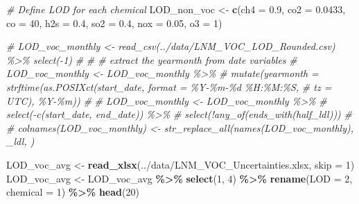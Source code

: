\documentclass[
]{article}
\newenvironment{Shaded}{\begin{snugshade}}{\end{snugshade}}
\newcommand{\AttributeTok}[1]{\textcolor[rgb]{0.13,0.29,0.53}{#1}}
\newcommand{\CommentTok}[1]{\textcolor[rgb]{0.56,0.35,0.01}{\textit{#1}}}
\newcommand{\DecValTok}[1]{\textcolor[rgb]{0.00,0.00,0.81}{#1}}
\newcommand{\FloatTok}[1]{\textcolor[rgb]{0.00,0.00,0.81}{#1}}
\newcommand{\FunctionTok}[1]{\textcolor[rgb]{0.13,0.29,0.53}{\textbf{#1}}}
\newcommand{\NormalTok}[1]{#1}
\newcommand{\OtherTok}[1]{\textcolor[rgb]{0.56,0.35,0.01}{#1}}
\newcommand{\SpecialCharTok}[1]{\textcolor[rgb]{0.81,0.36,0.00}{\textbf{#1}}}
\newcommand{\StringTok}[1]{\textcolor[rgb]{0.31,0.60,0.02}{#1}}
\begin{document}
\begin{Shaded}
\begin{Highlighting}[]
\CommentTok{\# Define LOD for each chemical}
\NormalTok{LOD\_non\_voc }\OtherTok{\textless{}{-}} \FunctionTok{c}\NormalTok{(}\StringTok{\textquotesingle{}ch4\textquotesingle{}} \OtherTok{=} \FloatTok{0.9}\NormalTok{, }
             \StringTok{\textquotesingle{}co2\textquotesingle{}} \OtherTok{=} \FloatTok{0.0433}\NormalTok{, }
             \StringTok{\textquotesingle{}co\textquotesingle{}} \OtherTok{=} \DecValTok{40}\NormalTok{,}
             \StringTok{\textquotesingle{}h2s\textquotesingle{}} \OtherTok{=} \FloatTok{0.4}\NormalTok{, }
             \StringTok{\textquotesingle{}so2\textquotesingle{}} \OtherTok{=} \FloatTok{0.4}\NormalTok{,}
             \StringTok{\textquotesingle{}nox\textquotesingle{}} \OtherTok{=} \FloatTok{0.05}\NormalTok{, }
             \StringTok{\textquotesingle{}o3\textquotesingle{}} \OtherTok{=} \DecValTok{1}\NormalTok{)}

\CommentTok{\# LOD\_voc\_monthly \textless{}{-} read\_csv(\textquotesingle{}../data/LNM\_VOC\_LOD\_Rounded.csv\textquotesingle{}) \%\textgreater{}\% select({-}1)}
\CommentTok{\# }
\CommentTok{\# \# extract the yearmonth from date variables}
\CommentTok{\# LOD\_voc\_monthly \textless{}{-} LOD\_voc\_monthly \%\textgreater{}\%}
\CommentTok{\#   mutate(yearmonth = strftime(as.POSIXct(start\_date, format = \textquotesingle{}\%Y{-}\%m{-}\%d \%H:\%M:\%S\textquotesingle{}, }
\CommentTok{\#                                             tz = \textquotesingle{}UTC\textquotesingle{}), \textquotesingle{}\%Y{-}\%m\textquotesingle{})) }
\CommentTok{\# }
\CommentTok{\# LOD\_voc\_monthly \textless{}{-} LOD\_voc\_monthly \%\textgreater{}\% }
\CommentTok{\#   select({-}c(start\_date, end\_date)) \%\textgreater{}\%}
\CommentTok{\#   select(!any\_of(ends\_with(\textquotesingle{}half\_ldl\textquotesingle{})))}
\CommentTok{\# }
\CommentTok{\# colnames(LOD\_voc\_monthly) \textless{}{-} str\_replace\_all(names(LOD\_voc\_monthly), \textquotesingle{}\_ldl\textquotesingle{}, \textquotesingle{}\textquotesingle{})}

\NormalTok{LOD\_voc\_avg }\OtherTok{\textless{}{-}} \FunctionTok{read\_xlsx}\NormalTok{(}\StringTok{\textquotesingle{}../data/LNM\_VOC\_Uncertainties.xlsx\textquotesingle{}}\NormalTok{, }\AttributeTok{skip =} \DecValTok{1}\NormalTok{)}
\NormalTok{LOD\_voc\_avg }\OtherTok{\textless{}{-}}\NormalTok{ LOD\_voc\_avg }\SpecialCharTok{\%\textgreater{}\%}
  \FunctionTok{select}\NormalTok{(}\DecValTok{1}\NormalTok{, }\DecValTok{4}\NormalTok{) }\SpecialCharTok{\%\textgreater{}\%}
  \FunctionTok{rename}\NormalTok{(}\StringTok{\textquotesingle{}LOD\textquotesingle{}} \OtherTok{=} \DecValTok{2}\NormalTok{, }\StringTok{\textquotesingle{}chemical\textquotesingle{}} \OtherTok{=} \DecValTok{1}\NormalTok{) }\SpecialCharTok{\%\textgreater{}\%}
  \FunctionTok{head}\NormalTok{(}\DecValTok{20}\NormalTok{)}
\end{Highlighting}
\end{Shaded}
\end{document}
